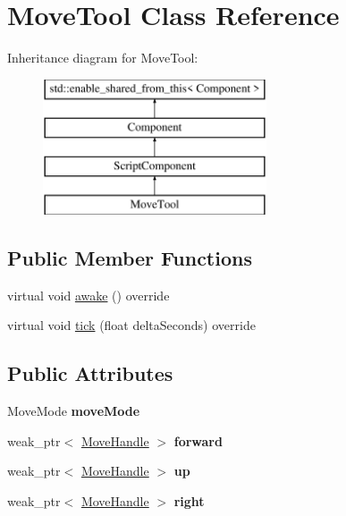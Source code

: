 \hypertarget{class_move_tool}{}\section{Move\+Tool Class Reference}
\label{class_move_tool}
Inheritance diagram for Move\+Tool\+:\begin{figure}[H]
\begin{center}
\leavevmode
\includegraphics[height=4.000000cm]{class_move_tool}
\end{center}
\end{figure}
\subsection*{Public Member Functions}
\begin{DoxyCompactItemize}
\item 
virtual void \hyperlink{class_move_tool_ac53066bdb36f2e01234fa58a20cc1f0d}{awake} () override
\item 
virtual void \hyperlink{class_move_tool_ad38e6fcb03e6d7b2f0ef241ec0eb5271}{tick} (float delta\+Seconds) override
\end{DoxyCompactItemize}
\subsection*{Public Attributes}
\begin{DoxyCompactItemize}
\item 
\hypertarget{class_move_tool_ada6e1ed12bb8d8e570611f962c69bd39}{}Move\+Mode {\bfseries move\+Mode}\label{class_move_tool_ada6e1ed12bb8d8e570611f962c69bd39}

\item 
\hypertarget{class_move_tool_a8f32b2f996a05392a0792d2ea4eb6320}{}weak\+\_\+ptr$<$ \hyperlink{class_move_handle}{Move\+Handle} $>$ {\bfseries forward}\label{class_move_tool_a8f32b2f996a05392a0792d2ea4eb6320}

\item 
\hypertarget{class_move_tool_aa2af9be79e0ac6067ff7e703b748a207}{}weak\+\_\+ptr$<$ \hyperlink{class_move_handle}{Move\+Handle} $>$ {\bfseries up}\label{class_move_tool_aa2af9be79e0ac6067ff7e703b748a207}

\item 
\hypertarget{class_move_tool_ab969dce017261f3da61e15db134872ad}{}weak\+\_\+ptr$<$ \hyperlink{class_move_handle}{Move\+Handle} $>$ {\bfseries right}\label{class_move_tool_ab969dce017261f3da61e15db134872ad}

\end{DoxyCompactItemize}
